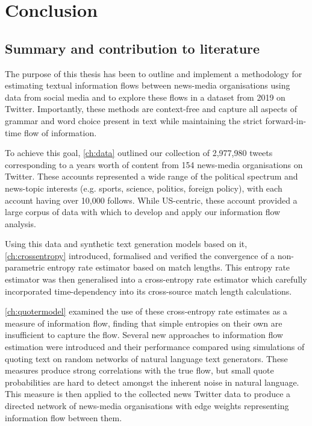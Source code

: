 \chapter{Conclusion}\label{ch:conclusion}

\section{Summary and contribution to literature}


The purpose of this thesis has been to outline and implement a methodology for estimating textual information flows between news-media organisations using data from social media and to explore these flows in a dataset from 2019 on Twitter. Importantly, these methods are context-free and capture all aspects of grammar and word choice present in text while maintaining the strict forward-in-time flow of information.

To achieve this goal, \autoref{ch:data} outlined our collection of 2,977,980 tweets corresponding to a years worth of content from 154 news-media organisations on Twitter. These accounts represented a wide range of the political spectrum and news-topic interests (e.g. sports, science, politics, foreign policy), with each account having over 10,000 follows. While US-centric, these account provided a large corpus of data with which to develop and apply our information flow analysis.

Using this data and synthetic text generation models based on it, \autoref{ch:crossentropy} introduced, formalised and verified the convergence of a non-parametric entropy rate estimator based on match lengths. This entropy rate estimator was then generalised into a cross-entropy rate estimator which carefully incorporated time-dependency into its cross-source match length calculations. 

\autoref{ch:quotermodel} examined the use of these cross-entropy rate estimates as a measure of information flow, finding that simple entropies on their own are insufficient to capture the flow. Several new approaches to information flow estimation were introduced and their performance compared using simulations of quoting text on random networks of natural language text generators. These measures produce strong correlations with the true flow, but small quote probabilities are hard to detect amongst the inherent noise in natural language. This measure is then applied to the collected news Twitter data to produce a directed network of news-media organisations with edge weights representing information flow between them. 

